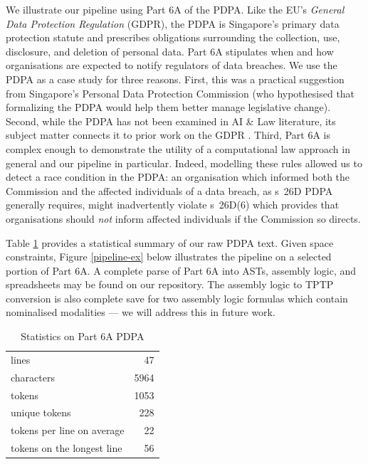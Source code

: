 \documentclass{IOS-Book-Article}
\begin{document}
We illustrate our pipeline using Part 6A of the PDPA. Like the EU's \textit{General Data Protection Regulation} (GDPR), the PDPA is Singapore's primary data protection statute and prescribes obligations surrounding the collection, use, disclosure, and deletion of personal data. Part 6A stipulates when and how organisations are expected to notify regulators of data breaches. We use the PDPA as a case study for three reasons. First, this was a practical suggestion from Singapore's Personal Data Protection Commission (who hypothesised that formalizing the PDPA would help them better manage legislative change).
Second, while the PDPA has not been examined in AI \& Law literature, its subject matter connects it to prior work on the GDPR \cite{palmirani_modelling_2018,palmirani_legal_2018,hickey_gdpr_2021}.
Third, Part 6A is complex enough to demonstrate the utility of a computational law approach in general and our pipeline in particular. Indeed, modelling these rules allowed us to detect a race condition in the PDPA: an organisation which informed both the Commission and the affected individuals of a data breach, as s~26D PDPA generally requires, might inadvertently violate s~26D(6) which provides that organisations should \textit{not} inform affected individuals if the Commission so directs.

Table \ref{stats} provides a statistical summary of our raw PDPA text. Given space constraints, Figure \ref{pipeline-ex} below illustrates the pipeline on a selected portion of Part 6A. A complete parse of Part 6A into ASTs, assembly logic, and spreadsheets may be found on our repository. The assembly logic to TPTP conversion is also complete save for two assembly logic formulas which contain nominalised modalities --- we will address this in future work.

\begin{table}[h!]
  \begin{tabular}{|l|r|}
\hline
        
lines & 47 \\
characters & 5964 \\
tokens & 1053 \\
unique tokens & 228 \\
tokens per line on average & 22 \\
tokens on the longest line & 56 \\
\hline
  \end{tabular}
  \caption{Statistics on Part 6A PDPA}
  \label{stats}
  \vspace{-8mm}
\end{table}
\end{document}
